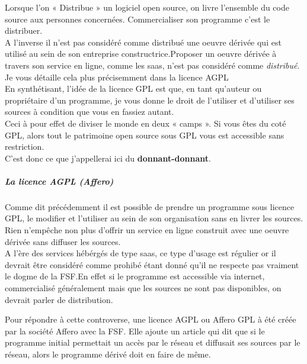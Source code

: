 				Lorsque l'on « Distribue » un logiciel open source, on livre l'ensemble du code source aux personnes concernées. Commercialiser son programme c'est le distribuer.\\

				A l'inverse il n'est pas considéré comme distribué une oeuvre dérivée qui est utilisé au sein de son entreprise constructrice.Proposer un oeuvre dérivée à travers son service en ligne, comme les \acrfull{saas}, n'est pas considéré comme \textit{distribué}.\\
				Je vous détaille cela plus précisemment dans la licence AGPL\\

				En synthétisant, l'idée de la licence GPL est que, en tant qu'auteur ou propriétaire d'un programme, je vous donne le droit de l'utiliser et d'utiliser ses sources à condition que vous en fassiez autant.\\

				Ceci à pour effet de diviser le monde en deux « camps ».
				Si vous êtes du coté GPL, alors tout le patrimoine open source sous GPL vous est accessible sans restriction.\\

				C'est donc ce que j'appellerai ici du \textbf{donnant-donnant}.

				\subparagraph{La licence AGPL (Affero)\\}
				
				Comme dit précédemment il est possible de prendre un programme sous licence GPL, le modifier et l'utiliser au sein de son organisation sans en livrer les sources. Rien n'empêche non plus d'offrir un service en ligne construit avec une oeuvre dérivée sans diffuser les sources.\\

				A l'ère des services hébérgés de type \acrshort{saas}, ce type d'usage est régulier or il devrait être considéré comme prohibé étant donné qu'il ne respecte pas vraiment le dogme de la FSF.En effet si le programme est accessible via internet, commercialisé généralement mais que les sources ne sont pas disponibles, on devrait parler de distribution.

				 Pour répondre à cette controverse, une licence AGPL ou Affero GPL à été créée par la société Affero avec la FSF. Elle ajoute un article qui dit que si le programme initial permettait un accès par le réseau et diffusait ses sources par le réseau, alors le programme dérivé doit en faire de même.\\

